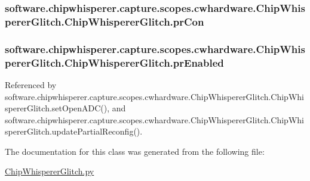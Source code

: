 \subsubsection[{pr\+Con}]{\setlength{\rightskip}{0pt plus 5cm}software.\+chipwhisperer.\+capture.\+scopes.\+cwhardware.\+Chip\+Whisperer\+Glitch.\+Chip\+Whisperer\+Glitch.\+pr\+Con}\label{classsoftware_1_1chipwhisperer_1_1capture_1_1scopes_1_1cwhardware_1_1ChipWhispererGlitch_1_1ChipWhispererGlitch_aaf683c49a9113957348c91907b380381}
\hypertarget{classsoftware_1_1chipwhisperer_1_1capture_1_1scopes_1_1cwhardware_1_1ChipWhispererGlitch_1_1ChipWhispererGlitch_a2d60ad13214695175a589e57d09b34a6}{}
\subsubsection[{pr\+Enabled}]{\setlength{\rightskip}{0pt plus 5cm}software.\+chipwhisperer.\+capture.\+scopes.\+cwhardware.\+Chip\+Whisperer\+Glitch.\+Chip\+Whisperer\+Glitch.\+pr\+Enabled}\label{classsoftware_1_1chipwhisperer_1_1capture_1_1scopes_1_1cwhardware_1_1ChipWhispererGlitch_1_1ChipWhispererGlitch_a2d60ad13214695175a589e57d09b34a6}


Referenced by software.\+chipwhisperer.\+capture.\+scopes.\+cwhardware.\+Chip\+Whisperer\+Glitch.\+Chip\+Whisperer\+Glitch.\+set\+Open\+A\+D\+C(), and software.\+chipwhisperer.\+capture.\+scopes.\+cwhardware.\+Chip\+Whisperer\+Glitch.\+Chip\+Whisperer\+Glitch.\+update\+Partial\+Reconfig().



The documentation for this class was generated from the following file\+:\begin{DoxyCompactItemize}
\item 
\hyperlink{ChipWhispererGlitch_8py}{Chip\+Whisperer\+Glitch.\+py}\end{DoxyCompactItemize}
